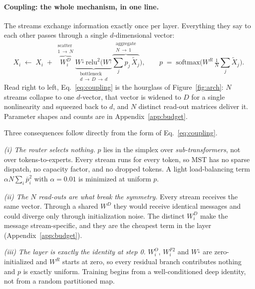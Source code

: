 \documentclass{article}
\newcommand{\dmodel}{D}
\newcommand{\dsub}{d}
\newcommand{\nsub}{N}
\begin{document}
\paragraph{Coupling: the whole mechanism, in one line.} The streams exchange
information exactly once per layer. Everything they say to each other passes
through a single $\dsub$-dimensional vector:
%
\begin{equation}
\label{eq:coupling}
X_i \;\leftarrow\; X_i \;+\;
\overbrace{W^{D}_i}^{\substack{\text{scatter}\\ 1\,\to\,\nsub}}
\underbrace{W^{\downarrow}\,\mathrm{relu}^2\Big(W^{\uparrow}}_{\substack{\text{bottleneck}\\ \dsub\,\to\,\dmodel\,\to\,\dsub}}
\overbrace{\textstyle\sum_{j} p_j\,\tilde{X}_j}^{\substack{\text{aggregate}\\ \nsub\,\to\,1}}\Big),
\qquad
p \;=\; \mathrm{softmax}\Big(W^{R}\,\tfrac{1}{\nsub}\textstyle\sum_{j}\tilde{X}_j\Big).
\end{equation}
%
Read right to left, Eq.~\ref{eq:coupling} is the hourglass of
Figure~\ref{fig:arch}: $\nsub$ streams collapse to one $\dsub$-vector, that vector
is widened to $\dmodel$ for a single nonlinearity and squeezed back to $\dsub$, and
$\nsub$ distinct read-out matrices deliver it. Parameter shapes and counts are in
Appendix~\ref{app:budget}.

Three consequences follow directly from the form of Eq.~\ref{eq:coupling}.

\emph{(i) The router selects nothing.} $p$ lies in the simplex over
\emph{sub-transformers}, not over tokens-to-experts. Every stream runs for every
token, so MST has no sparse dispatch, no capacity factor, and no dropped tokens. A
light load-balancing term $\alpha\nsub\sum_i \bar{p}_i^2$ with $\alpha{=}0.01$
\citep{fedus2022switch} is minimized at uniform $p$.

\emph{(ii) The $\nsub$ read-outs are what break the symmetry.} Every stream
receives the same vector. Through a shared $W^{D}$ they would receive identical
messages and could diverge only through initialization noise. The distinct
$W^{D}_i$ make the message stream-specific, and they are the cheapest term in the
layer (Appendix~\ref{app:budget}).

\emph{(iii) The layer is exactly the identity at step 0.} $W^{O}_i$, $W^{F2}_i$
and $W^{\downarrow}$ are zero-initialized and $W^{R}$ starts at zero, so every
residual branch contributes nothing and $p$ is exactly uniform. Training begins
from a well-conditioned deep identity, not from a random partitioned map.
\end{document}
